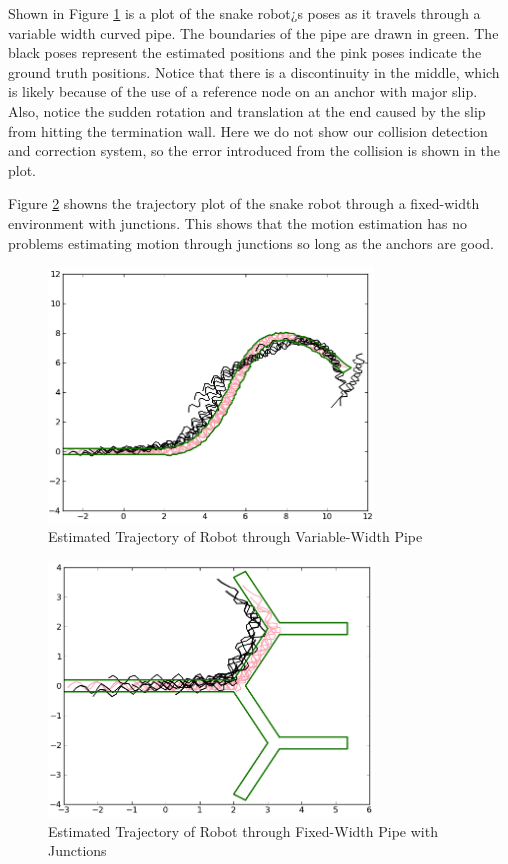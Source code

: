 Shown in Figure \ref{varWidth} is a plot of the snake robot¿s poses as it travels through a variable width curved pipe.  The boundaries of the pipe are drawn in green.  The black poses represent the estimated positions and the pink poses indicate the ground truth positions.  Notice that there is a discontinuity in the middle, which is likely because of the use of a reference node on an anchor with major slip.  Also, notice the sudden rotation and translation at the end caused by the slip from hitting the termination wall.   Here we do not show our collision detection and correction system, so the error introduced from the collision is shown in the plot.

Figure \ref{juncFix} showns the trajectory plot of the snake robot through a fixed-width environment with junctions.  This shows that the motion estimation has no problems estimating motion through junctions so long as the anchors are good.
 
\begin{figure}
  \begin{center}
    \includegraphics[width=3.4in]{plotMotionVariableWidth.png}
  \end{center}
  \caption{Estimated Trajectory of Robot through Variable-Width Pipe}
	\label{varWidth}
\end{figure}

\begin{figure}
  \begin{center}
    \includegraphics[width=3.4in]{plotMotionJunctions.png}
  \end{center}
  \caption{Estimated Trajectory of Robot through Fixed-Width Pipe with Junctions}
	\label{juncFix}
\end{figure}

